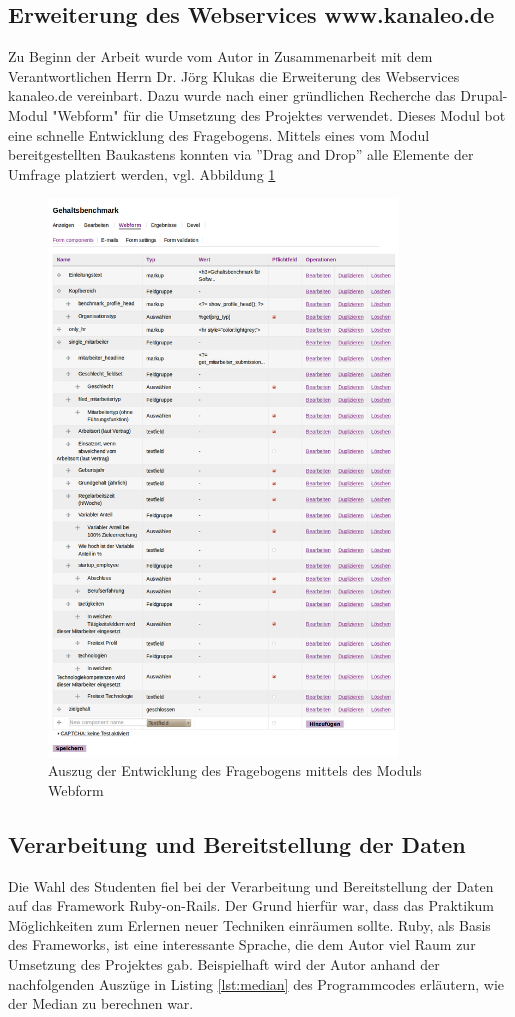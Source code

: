 \subsection{Erweiterung des Webservices www.kanaleo.de}
Zu Beginn der Arbeit wurde vom Autor in Zusammenarbeit mit dem Verantwortlichen
Herrn Dr. Jörg Klukas die Erweiterung des Webservices kanaleo.de
vereinbart. Dazu wurde nach einer gründlichen Recherche das Drupal-Modul
"Webform" für die Umsetzung des Projektes verwendet. Dieses Modul bot eine
schnelle Entwicklung des Fragebogens. Mittels eines vom Modul bereitgestellten
Baukastens konnten via ''Drag and Drop'' alle Elemente der Umfrage platziert
werden, vgl. Abbildung \ref{fig: Fragebogen edit}
\begin{figure}[htbp]
 \centering
 \includegraphics[width=350px]{./material/gehaltsformedit.png}
 \caption{Auszug der Entwicklung des Fragebogens mittels des Moduls Webform}
 \label{fig: Fragebogen edit}
\end{figure}
\newpage
\subsection{Verarbeitung und Bereitstellung der Daten}
Die Wahl des Studenten fiel bei der Verarbeitung und Bereitstellung der Daten
auf das Framework Ruby-on-Rails. Der Grund hierfür war, dass das Praktikum
Möglichkeiten zum Erlernen neuer Techniken einräumen sollte. Ruby, als Basis
des Frameworks, ist eine interessante Sprache, die dem Autor viel Raum zur
Umsetzung des Projektes gab. Beispielhaft wird der Autor anhand der nachfolgenden Auszüge in Listing \ref{lst:median} des Programmcodes erläutern, wie der Median zu berechnen war.

